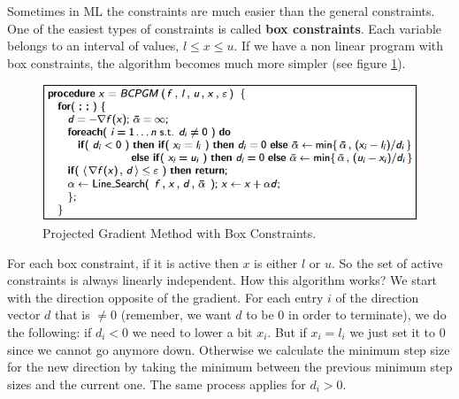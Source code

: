 \par Sometimes in ML the constraints are much easier than the general constraints. One of the easiest types of constraints is called \textbf{box constraints}. Each variable belongs to an interval of values, $l \leq x \leq u$. If we have a non linear program with box constraints, the algorithm becomes much more simpler (see figure \ref{fig:chapter3-pgm_box}).
\begin{figure}
    \centering
    \includegraphics[scale=0.4]{figures/3/chapter3-pgm_box.png}
    \caption{Projected Gradient Method with Box Constraints.}
    \label{fig:chapter3-pgm_box}
\end{figure}
\par For each box constraint, if it is active then $x$ is either $l$ or $u$. So the set of active constraints is always linearly independent. How this algorithm works? We start with the direction opposite of the gradient. For each entry $i$ of the direction vector $d$ that is $\neq 0$ (remember, we want $d$ to be 0 in order to terminate), we do the following: if $d_i < 0$ we need to lower a bit $x_i$. But if $x_i = l_i$ we just set it to 0 since we cannot go anymore down. Otherwise we calculate the minimum step size for the new direction by taking the minimum between the previous minimum step sizes and the current one. The same process applies for $d_i > 0$.
%
%
%
